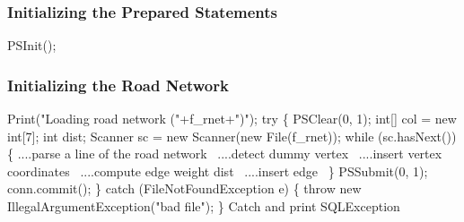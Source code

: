 \documentclass{article}
\def\nwendcode{\endtrivlist \endgroup}
\let\nwdocspar=\par
\theoremstyle{definition}
\begin{document}
\subsubsection{Initializing the Prepared Statements}
\label{sec:initializing-the-prepared-statements}
\nwenddocs{}\endmoddef{}
PSInit();
\nwendcode{}\nwdocspar

\subsubsection{Initializing the Road Network}
\label{sec:initializing-the-road-network}
\nwenddocs{}\endmoddef{}
Print("Loading road network ("+f_rnet+")");
try \{
  PSClear(0, 1);
  int[] col = new int[7];
  int dist;
  Scanner sc = new Scanner(new File(f_rnet));
  while (sc.hasNext()) \{
    \LA{}....parse a line of the road network~{\nwtagstyle{}}\RA{}
    \LA{}....detect dummy vertex~{\nwtagstyle{}}\RA{}
    \LA{}....insert vertex coordinates~{\nwtagstyle{}}\RA{}
    \LA{}....compute edge weight \code{}dist\edoc{}~{\nwtagstyle{}}\RA{}
    \LA{}....insert edge~{\nwtagstyle{}}\RA{}
  \}
  PSSubmit(0, 1);
  conn.commit();
\} catch (FileNotFoundException e) \{
  throw new IllegalArgumentException("bad file");
\}
\LA{}Catch and print \code{}SQLException\edoc{}~{\nwtagstyle{}}\RA{}
\nwendcode{}\nwdocspar
\end{document}
